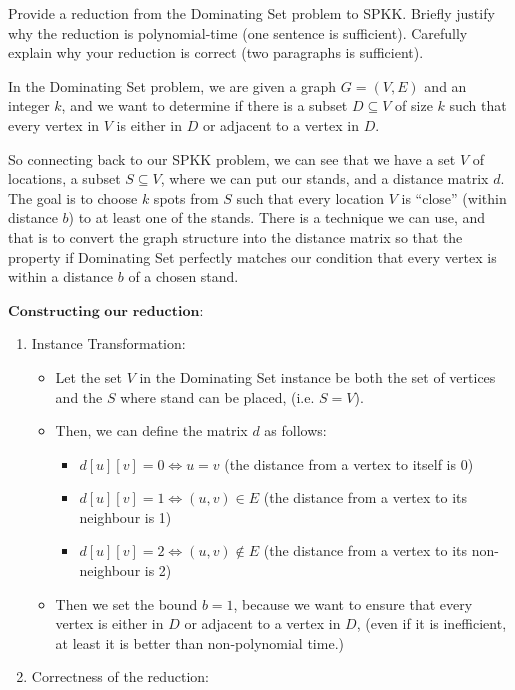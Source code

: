 \documentclass[11pt,fleqn]{exam}
\newenvironment{soln}{\color{solnblue}}{}
\begin{document}
\begin{questions}
\question[8]
Provide a reduction from the Dominating Set problem to SPKK.
Briefly justify why the reduction is polynomial-time (one sentence is sufficient). Carefully explain why your reduction is correct (two paragraphs is sufficient).

\begin{soln}
      In the Dominating Set problem, we are given a graph $G = (V, E)$ 
      and an integer $k$, and we want to determine if there 
      is a subset $D \subseteq V$ of size $k$ such that every vertex 
      in $V$ is either in $D$ or adjacent to a vertex in $D$.

      So connecting back to our SPKK problem, we can see that 
      we have a set $V$ of locations, a subset $S \subseteq V$, where we 
      can put our stands, and a distance matrix $d$. The goal is to choose $k$
      spots from $S$ such that every location $V$ is ``close'' 
      (within distance $b$) to at least one of the stands. 
      There is a technique we can use, and that is to convert the graph
      structure into the distance matrix so that the property if Dominating Set
      perfectly matches our condition that every vertex is within a distance $b$
      of a chosen stand.
      
      $\textbf{Constructing our reduction: }$
      \begin{enumerate}
            \item Instance Transformation:
            \begin{itemize}
                  \item Let the set $V$ in the Dominating Set instance be both
                  the set of vertices and the $S$ where stand can be placed, (i.e. $S = V$).
                  \item Then, we can define the matrix $d$ as follows:
                  \begin{itemize}
                        \item $d[u][v] = 0 \Leftrightarrow u = v$ (the distance from a vertex to itself is 0)
                        \item $d[u][v] = 1 \Leftrightarrow (u, v) \in E$ (the distance from a vertex to its neighbour is 1)
                        \item $d[u][v] = 2 \Leftrightarrow (u, v) \notin E$ (the distance from a vertex to its non-neighbour is 2)
                  \end{itemize}
                  \item Then we set the bound $b = 1$, because we want to ensure that 
                  every vertex is either in $D$ or adjacent to a vertex in $D$, 
                  (even if it is inefficient, at least it is better than non-polynomial time.)
            \end{itemize}
            \item Correctness of the reduction:
            

\end{enumerate}
\end{soln}
\end{questions}
\end{document}
